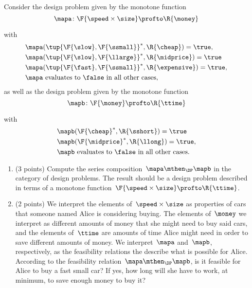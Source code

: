 \documentclass[paper=8.125in:10.250in,pagesize=pdftex,
    headinclude=false,footinclude=false,oneside,egregdoesnotlikesansseriftitles]{kaobook}
\begin{document}
\begin{gradedexercise}
Consider the design problem given by the monotone function 
\begin{equation}
\mapa\colon \F{\speed \times \size}\profto \R{\money}
\end{equation}
\begin{center}
\end{center}
with 
\begin{align*}
&\mapa(\tup{ \F{\slow}, \F{\ssmall}}^*, \R{\cheap}) = \true, \\
&\mapa(\tup{ \F{\slow}, \F{\llarge}}^*, \R{\midprice}) = \true \\
&\mapa(\tup{ \F{\fast}, \F{\ssmall}}^*, \R{\expensive}) =  \true, \\
&\mapa \text{ evaluates to } \false \text{ in all other cases},
\end{align*}
as well as the design problem given by the monotone function 
\begin{equation}
\mapb\colon \F{\money} \profto \R{\ttime}
\end{equation}
\begin{center}
\end{center}
with 
\begin{align*}
&\mapb( \F{\cheap}^*, \R{\sshort}) = \true \\
&\mapb(\F{\midprice}^*, \R{\llong}) = \true, \\
&\mapb \text{ evaluates to } \false \text{ in all other cases}.
\end{align*}

\begin{enumerate} 
\item (3 points) Compute the series composition~$\mapa \mthen_\DP \mapb$ in the category of design problems.
The result should be a design problem described in terms of a monotone function~$\F{\speed \times \size} \profto \R{\ttime}$.
\item (2 points) We interpret the elements of~$\speed \times \size$ as properties of cars that someone named Alice is considering buying.
The elements of~$\money$ we interpret as different amounts of money that she might need to buy said cars, and the elements of~$\ttime$ are amounts of time Alice might need in order to save different amounts of money.
We interpret~$\mapa$ and~$\mapb$, respectively, as the feasibility relations the describe what is possible for Alice.
According to the feasibility relation~$\mapa \mthen_\DP \mapb$, is it feasible for Alice to buy a fast small car?
If yes, how long will she have to work, at minimum, to save enough money to buy it?
\end{enumerate}
\end{gradedexercise}
\end{document}
